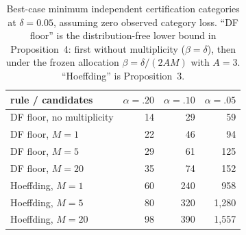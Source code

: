 \begin{table}[t]
\centering
\caption{Best-case minimum independent certification categories at $\delta=0.05$, assuming zero observed category loss. ``DF floor'' is the distribution-free lower bound in Proposition~4: first without multiplicity ($\beta=\delta$), then under the frozen allocation $\beta=\delta/(2AM)$ with $A=3$. ``Hoeffding'' is Proposition~3.}
\label{tab:certificate-feasibility}
\footnotesize
\setlength{\tabcolsep}{4pt}
\begin{tabular}{lrrr}
\toprule
rule / candidates & $\alpha=.20$ & $\alpha=.10$ & $\alpha=.05$ \\
\midrule
DF floor, no multiplicity & 14 & 29 & 59 \\
\midrule
DF floor, $M=1$  & 22 & 46 & 94 \\
DF floor, $M=5$  & 29 & 61 & 125 \\
DF floor, $M=20$ & 35 & 74 & 152 \\
\midrule
Hoeffding, $M=1$  & 60 & 240 & 958 \\
Hoeffding, $M=5$  & 80 & 320 & 1,280 \\
Hoeffding, $M=20$ & 98 & 390 & 1,557 \\
\bottomrule
\end{tabular}
\end{table}
